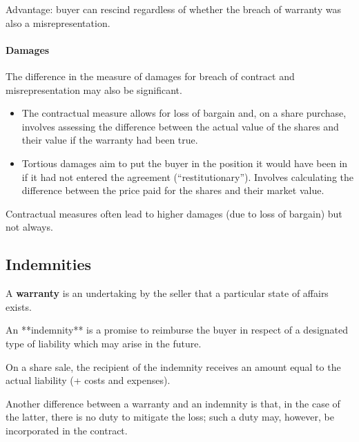 \documentclass[
]{article}
\newenvironment{Shaded}{}{}
\newcommand{\NormalTok}[1]{#1}
\providecommand{\tightlist}{%
  \setlength{\itemsep}{0pt}\setlength{\parskip}{0pt}}
\begin{document}
Advantage: buyer can rescind regardless of whether the breach of
warranty was also a misrepresentation.

\hypertarget{damages-1}{%
\paragraph{Damages}\label{damages-1}}

The difference in the measure of damages for breach of contract and
misrepresentation may also be significant.

\begin{itemize}
\tightlist
\item
  The contractual measure allows for loss of bargain and, on a share
  purchase, involves assessing the difference between the actual value
  of the shares and their value if the warranty had been true.
\item
  Tortious damages aim to put the buyer in the position it would have
  been in if it had not entered the agreement (``restitutionary'').
  Involves calculating the difference between the price paid for the
  shares and their market value.
\end{itemize}

Contractual measures often lead to higher damages (due to loss of
bargain) but not always.

\hypertarget{indemnities}{%
\subsection{Indemnities}\label{indemnities}}

A \textbf{warranty} is an undertaking by the seller that a particular
state of affairs exists.

\begin{Shaded}
\begin{Highlighting}[]
\NormalTok{An **indemnity** is a promise to reimburse the buyer in respect of a designated type of liability which may arise in the future. }
\end{Highlighting}
\end{Shaded}

On a share sale, the recipient of the indemnity receives an amount equal
to the actual liability (+ costs and expenses).

\begin{Shaded}
\begin{Highlighting}[]
\NormalTok{Another difference between a warranty and an indemnity is that, in the case of the latter, there is no duty to mitigate the loss; such a duty may, however, be incorporated in the contract.}
\end{Highlighting}
\end{Shaded}
\end{document}

